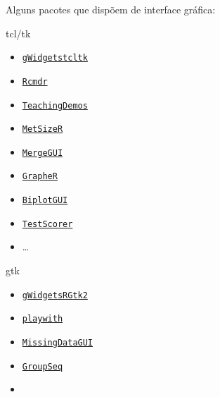 \begin{frame}

  Alguns pacotes que dispõem de interface gráfica:

  \begin{multicols}{2}
    \begin{block}{tcl/tk}
      \begin{itemize}
        \itemsep1pt\parskip0pt
      \item
        \href{http://cran.r-project.org/web/packages/gWidgetstcltk/index.html}{\texttt{gWidgetstcltk}}
      \item
        \href{http://cran.r-project.org/web/packages/Rcmdr/index.html}{\texttt{Rcmdr}}
      \item
        \href{http://cran.r-project.org/web/packages/TeachingDemos/index.html}{\texttt{TeachingDemos}}
      \item
        \href{http://cran.r-project.org/web/packages/MetSizeR/index.html}{\texttt{MetSizeR}}
      \item
        \href{http://cran.r-project.org/web/packages/MergeGUI/index.html}{\texttt{MergeGUI}}
      \item
        \href{http://cran.r-project.org/web/packages/GrapheR/index.html}{\texttt{GrapheR}}
      \item
        \href{http://cran.r-project.org/web/packages/BiplotGUI/index.html}{\texttt{BiplotGUI}}
      \item
        \href{http://cran.r-project.org/web/packages/TestScorer/index.html}{\texttt{TestScorer}}
      \item \ldots
      \end{itemize}
    \end{block}
    \vfill \columnbreak
    \begin{block}{gtk}
      \begin{itemize}
        \itemsep1pt\parskip0pt
      \item
        \href{http://cran.r-project.org/web/packages/gWidgetsRGtk2/index.html}{\texttt{gWidgetsRGtk2}}
      \item
        \href{http://cran.r-project.org/web/packages/playwith/index.html}{\texttt{playwith}}
      \item
        \href{http://cran.r-project.org/web/packages/MissingDataGUI/index.html}{\texttt{MissingDataGUI}}
      \item
        \href{http://cran.r-project.org/web/packages/GroupSeq/index.html}{\texttt{GroupSeq}}
      \item

\end{itemize}
\end{block}
\end{multicols}
\end{frame}
